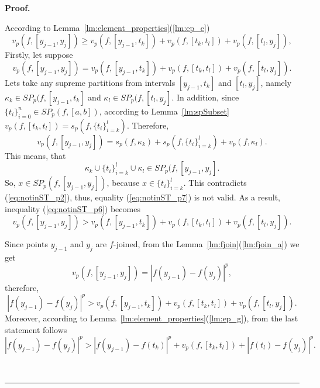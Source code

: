 \documentclass[12pt, a4paper]{article}
\newenvironment{proof}[1][Proof]{\noindent \textbf{#1.} }{\  \rule{0.5em}{0.5em}}
\numberwithin{equation}{section}
\begin{document}
\begin{proof}
 
  According to Lemma~\ref{lm:element_properties}(\ref{lm:ep_e})
  \begin{equation}\label{eq:notinST_p6}
    v_p(f,[y_{j-1},y_j]) \geq v_p(f,[y_{j-1},t_{k}]) 
      + v_p(f,[t_{k},t_{l}]) + v_p(f,[t_{l},y_j]),
  \end{equation}      
  Firstly, let suppose   
  \begin{equation}\label{eq:notinST_p7}
    v_p(f,[y_{j-1},y_j]) = v_p(f,[y_{j-1},t_{k}]) 
      + v_p(f,[t_{k},t_{l}]) + v_p(f,[t_{l},y_j]).
  \end{equation}   
  Lets take any supreme partitions from intervals
  $[y_{j-1},t_{k}]$ and  $[t_{l},y_j]$, namely
  $\kappa_k \in SP_p(f,[y_{j-1},t_{k}]$ and
  $\kappa_l \in SP_p(f,[t_{l},y_j]$.  
  In addition, since $\{t_i\}_{i=0}^n \in SP_p(f, [a, b])$,
  according to Lemma~\ref{lm:spSubset}
  $v_p(f,[t_{k},t_{l}]) = s_p(f,\{t_i\}_{i=k}^l)$.
  Therefore,
  \begin{equation*}\label{eq:notinST_p8}
    v_p(f,[y_{j-1},y_j]) = s_p(f,\kappa_k) 
      + s_p(f,\{t_i\}_{i=k}^l) + v_p(f,\kappa_l).
  \end{equation*}  
  This means, that 
  \begin{equation*}\label{eq:notinST_p8}
    \kappa_k \cup \{t_i\}_{i=k}^l \cup \kappa_l 
      \in SP_p(f, [y_{j-1}, y_j].
  \end{equation*} 
  So, 
  $x \in \overline{SP}_p(f, [y_{j-1}, y_j])$, 
  because $x \in \{t_i\}_{i=k}^l$.
  This contradicts (\ref{eq:notinST_p2}),
  thus, equality (\ref{eq:notinST_p7}) is not valid.
  As a result, inequality (\ref{eq:notinST_p6}) becomes
  \begin{equation}\label{eq:notinST_p9}
    v_p(f,[y_{j-1},y_j]) > v_p(f,[y_{j-1},t_{k}]) 
      + v_p(f,[t_{k},t_{l}]) + v_p(f,[t_{l},y_j]).
  \end{equation}    
  
  Since points $y_{j-1}$ and $y_j$ are $f$-joined,
  from the Lemma~\ref{lm:fjoin}(\ref{lm:fjoin_a}) we get
  \begin{equation*}\label{eq:notinST_p10}
    v_p(f,[y_{j-1},y_j]) = |f(y_{j-1})-f(y_j)|^p,
  \end{equation*}   
  therefore,
  \begin{equation*}\label{eq:notinST_p11}
    |f(y_{j-1})-f(y_j)|^p > v_p(f,[y_{j-1},t_{k}]) 
      + v_p(f,[t_{k},t_{l}]) + v_p(f,[t_{l},y_j]). 
  \end{equation*}        
  Moreover, according to 
  Lemma~\ref{lm:element_properties}(\ref{lm:ep_g}), 
  from the last statement follows
  \begin{equation} \label{eq:notinST_p12}
    |f(y_{j-1})-f(y_j)|^p > |f(y_{j-1})-f(t_{k})|^p +
       v_p(f,[t_k,t_l]) +  |f(t_{l})-f(y_j)|^p.   
  \end{equation}  
  

\end{proof}
\end{document}
